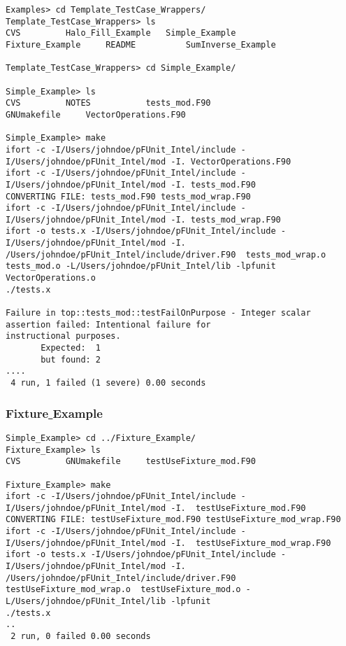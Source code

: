 \documentclass[10pt]{article}
\begin{document}
{\small \begin{verbatim}
Examples> cd Template_TestCase_Wrappers/
Template_TestCase_Wrappers> ls
CVS			Halo_Fill_Example	Simple_Example
Fixture_Example		README			SumInverse_Example

Template_TestCase_Wrappers> cd Simple_Example/

Simple_Example> ls
CVS			NOTES			tests_mod.F90
GNUmakefile		VectorOperations.F90

Simple_Example> make
ifort -c -I/Users/johndoe/pFUnit_Intel/include -I/Users/johndoe/pFUnit_Intel/mod -I. VectorOperations.F90
ifort -c -I/Users/johndoe/pFUnit_Intel/include -I/Users/johndoe/pFUnit_Intel/mod -I. tests_mod.F90
CONVERTING FILE: tests_mod.F90 tests_mod_wrap.F90
ifort -c -I/Users/johndoe/pFUnit_Intel/include -I/Users/johndoe/pFUnit_Intel/mod -I. tests_mod_wrap.F90
ifort -o tests.x -I/Users/johndoe/pFUnit_Intel/include -I/Users/johndoe/pFUnit_Intel/mod -I. /Users/johndoe/pFUnit_Intel/include/driver.F90  tests_mod_wrap.o  tests_mod.o -L/Users/johndoe/pFUnit_Intel/lib -lpfunit VectorOperations.o
./tests.x     
  
Failure in top::tests_mod::testFailOnPurpose - Integer scalar assertion failed: Intentional failure for 
instructional purposes.
       Expected:  1
       but found: 2
....
 4 run, 1 failed (1 severe) 0.00 seconds
\end{verbatim}
}

\subsubsection{Fixture\underline{ }Example}

{\small \begin{verbatim}
Simple_Example> cd ../Fixture_Example/
Fixture_Example> ls
CVS			GNUmakefile		testUseFixture_mod.F90

Fixture_Example> make
ifort -c -I/Users/johndoe/pFUnit_Intel/include -I/Users/johndoe/pFUnit_Intel/mod -I.  testUseFixture_mod.F90
CONVERTING FILE: testUseFixture_mod.F90 testUseFixture_mod_wrap.F90
ifort -c -I/Users/johndoe/pFUnit_Intel/include -I/Users/johndoe/pFUnit_Intel/mod -I.  testUseFixture_mod_wrap.F90
ifort -o tests.x -I/Users/johndoe/pFUnit_Intel/include -I/Users/johndoe/pFUnit_Intel/mod -I. /Users/johndoe/pFUnit_Intel/include/driver.F90  testUseFixture_mod_wrap.o  testUseFixture_mod.o -L/Users/johndoe/pFUnit_Intel/lib -lpfunit 
./tests.x     
..
 2 run, 0 failed 0.00 seconds
\end{verbatim}
}
\end{document}

